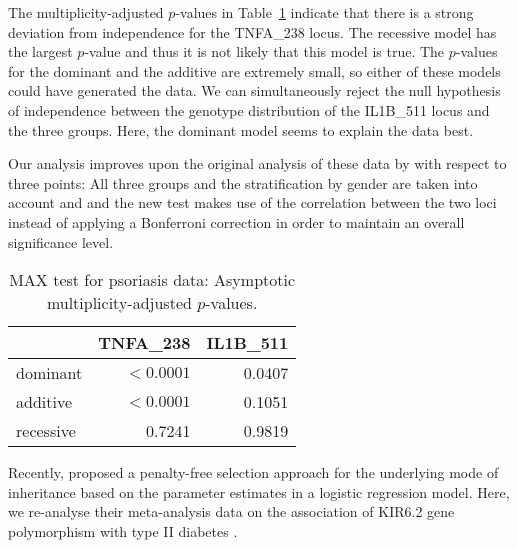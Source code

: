 \documentclass[bimj,fleqn]{w-art}
\begin{document}
The multiplicity-adjusted $p$-values in Table~\ref{pstab} indicate that
there is a strong deviation from independence for the TNFA\_238 locus.
The recessive model has the largest $p$-value and thus it is not likely
that this model is true. The $p$-values for the dominant and the 
additive are extremely small, so either of these models could have generated 
the data. We can simultaneously reject the null hypothesis of independence
between the genotype distribution of the IL1B\_511 locus and the three groups.
Here, the dominant model seems to explain the data best. 

Our analysis improves upon the original analysis of these data by \citet{Reich:2002}
with respect to three points: All three groups and the stratification
by gender are taken into account and and the new test makes use of the
correlation between the two loci instead of applying a Bonferroni correction
in order to maintain an overall significance level.


\begin{table}
\begin{center}
\caption{MAX test for psoriasis data: Asymptotic multiplicity-adjusted $p$-values. \label{pstab}}
\vspace*{0.5cm}
\begin{tabular}{lrr}
 & TNFA\_238 & IL1B\_511 \\ \hline
dominant  &  $< 0.0001$&0.0407 \\ 
additive  &  $< 0.0001$&0.1051 \\ 
recessive  &  0.7241&0.9819 \\ \hline
\end{tabular}
\end{center}
\end{table}

Recently, \citet{Bagos2007} proposed a penalty-free selection approach for the underlying mode of inheritance
based on the parameter estimates in a logistic regression model. Here, we re-analyse their meta-analysis 
data on the association of KIR6.2 gene polymorphism with type II diabetes 
\citep[Table~1 on page 3 in][]{Bagos2007}.
\end{document}
